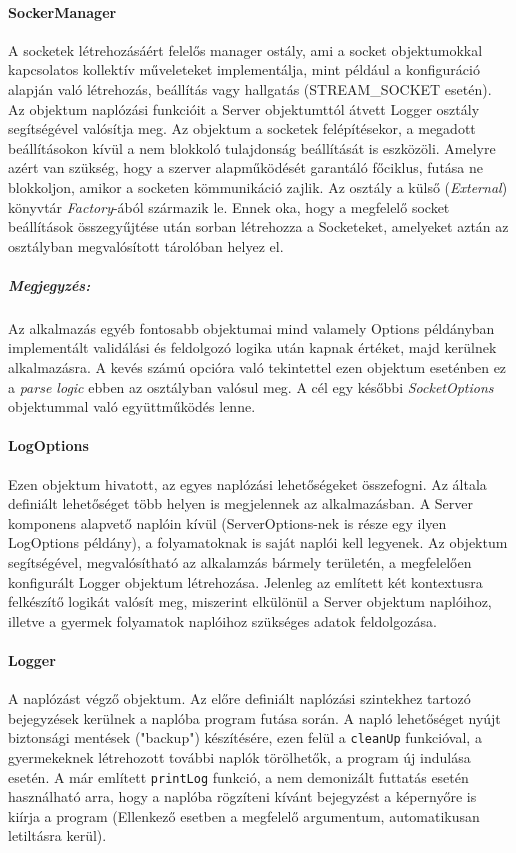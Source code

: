 \documentclass[12pt]{report}
\begin{document}
  \paragraph{SockerManager}
  A socketek létrehozásáért felelős manager ostály, ami a socket objektumokkal kapcsolatos kollektív műveleteket implementálja, mint például a konfiguráció alapján való létrehozás, beállítás vagy hallgatás (STREAM\_SOCKET esetén). Az objektum naplózási funkcióit a Server objektumttól átvett Logger osztály segítségével valósítja meg. Az objektum a socketek felépítésekor, a megadott beállításokon kívül a nem blokkoló tulajdonság beállítását is eszközöli. Amelyre azért van szükség, hogy a szerver alapműködését garantáló főciklus, futása ne blokkoljon, amikor a socketen kömmunikáció zajlik.
  Az osztály a külső (\textit{External}) könyvtár \textit{Factory}-ából származik le. Ennek oka, hogy a megfelelő socket beállítások összegyűjtése után sorban létrehozza a Socketeket, amelyeket aztán az osztályban megvalósított tárolóban helyez el.
  \subparagraph{Megjegyzés:} Az alkalmazás egyéb fontosabb objektumai mind valamely Options példányban implementált validálási és feldolgozó logika után kapnak értéket, majd kerülnek alkalmazásra. A kevés számú opcióra való tekintettel ezen objektum eseténben ez a \textit{parse logic} ebben az osztályban valósul meg. A cél egy későbbi \textit{SocketOptions} objektummal való együttműködés lenne. 
  \paragraph{LogOptions}
  Ezen objektum hivatott, az egyes naplózási lehetőségeket összefogni. Az általa definiált lehetőséget több helyen is megjelennek az alkalmazásban. A Server komponens alapvető naplóin kívül (ServerOptions-nek is része egy ilyen LogOptions példány), a folyamatoknak is saját naplói kell legyenek. Az objektum segítségével, megvalósítható az alkalamzás bármely területén, a megfelelően konfigurált Logger objektum létrehozása. Jelenleg az említett két kontextusra felkészítő logikát valósít meg, miszerint elkülönül a Server objektum naplóihoz, illetve a gyermek folyamatok naplóihoz szükséges adatok feldolgozása.
  \paragraph{Logger}
  A naplózást végző objektum. Az előre definiált naplózási szintekhez tartozó bejegyzések kerülnek a naplóba program futása során. A napló lehetőséget nyújt biztonsági mentések ("backup") készítésére, ezen felül a \verb|cleanUp| funkcióval, a gyermekeknek létrehozott további naplók törölhetők, a program új indulása esetén. A már említett \verb|printLog| funkció, a nem demonizált futtatás esetén használható arra, hogy a naplóba rögzíteni kívánt bejegyzést a képernyőre is kiírja a program (Ellenkező esetben a megfelelő argumentum, automatikusan letiltásra kerül).
\end{document}
